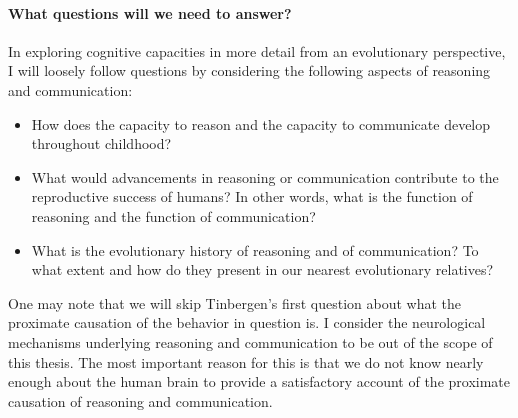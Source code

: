 \paragraph{What questions will we need to answer?}
In exploring cognitive capacities in more detail from an evolutionary perspective, I will loosely follow  questions by considering the following aspects of reasoning and communication:
\begin{itemize}
    \item How does the capacity to reason and the capacity to communicate develop throughout childhood?
    \item What would advancements in reasoning or communication contribute to the reproductive success of humans? In other words, what is the function of reasoning and the function of communication?
    \item What is the evolutionary history of reasoning and of communication? To what extent and how do they present in our nearest evolutionary relatives?
\end{itemize}
One may note that we will skip Tinbergen's first question about what the proximate causation of the behavior in question is. I consider the neurological mechanisms underlying reasoning and communication to be out of the scope of this thesis. The most important reason for this is that we do not know nearly enough about the human brain to provide a satisfactory account of the proximate causation of reasoning and communication.
